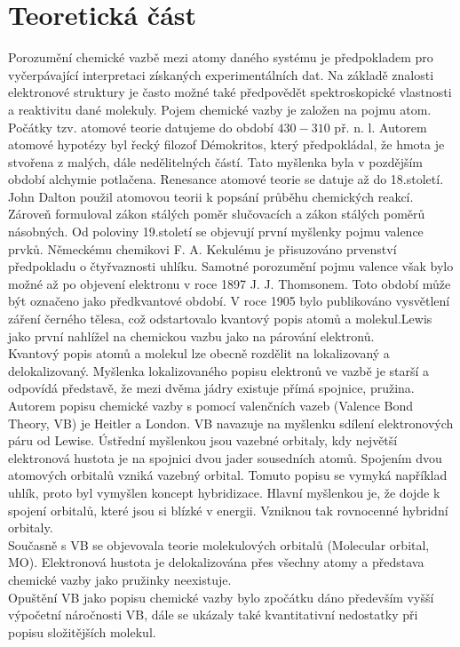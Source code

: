 \documentclass[
  digital, %
  table,   %
  lof,     %
  lot,     %
]{fithesis3}
\begin{document}
\chapter{Teoretická část}
Porozumění chemické vazbě mezi atomy daného systému je předpokladem pro vyčerpávající interpretaci získaných experimentálních dat. Na základě znalosti elektronové struktury je často možné také předpovědět spektroskopické vlastnosti a reaktivitu dané molekuly. Pojem chemické vazby je založen na pojmu atom. Počátky tzv. atomové teorie datujeme do období $430-310$ př. n. l. Autorem atomové hypotézy byl řecký filozof Démokritos, který předpokládal, že hmota je stvořena z malých, dále nedělitelných částí. Tato myšlenka byla v pozdějším období alchymie potlačena. Renesance atomové teorie se datuje až do 18.století. John Dalton použil atomovou teorii k popsání průběhu chemických reakcí. Zároveň formuloval zákon stálých poměr slučovacích a zákon stálých poměrů násobných. Od poloviny 19.století se objevují první myšlenky pojmu valence prvků. Německému chemikovi F. A. Kekulému je přisuzováno prvenství předpokladu o čtyřvaznosti uhlíku. Samotné porozumění pojmu valence však bylo možné až po objevení elektronu v roce 1897 J. J. Thomsonem. Toto období může být označeno jako předkvantové období. V roce 1905 bylo publikováno vysvětlení záření černého tělesa, což odstartovalo kvantový popis atomů a molekul.Lewis jako první nahlížel na chemickou vazbu jako na párování elektronů. \cite{Munzarova1996thesis} \\
Kvantový popis atomů a molekul lze obecně rozdělit na lokalizovaný a delokalizovaný. Myšlenka lokalizovaného popisu elektronů ve vazbě je starší a odpovídá představě, že mezi dvěma jádry existuje přímá spojnice, pružina. Autorem popisu chemické vazby s pomocí valenčních vazeb (Valence Bond Theory, VB) je Heitler a London. VB navazuje na myšlenku sdílení elektronových páru od Lewise. Ústřední myšlenkou jsou vazebné orbitaly, kdy největší elektronová hustota je na spojnici dvou jader sousedních atomů. Spojením dvou atomových orbitalů vzniká vazebný orbital. Tomuto popisu se vymyká například uhlík, proto byl vymyšlen koncept hybridizace. Hlavní myšlenkou je, že dojde k spojení orbitalů, které jsou si blízké v energii. Vzniknou tak rovnocenné hybridní orbitaly. \cite{Munzarova1996thesis} \\
Současně s VB se objevovala teorie molekulových orbitalů (Molecular orbital, MO). Elektronová hustota je delokalizována přes všechny atomy a představa chemické vazby jako pružinky neexistuje.\cite{Munzarova1996thesis} \\
Opuštění VB jako popisu chemické vazby bylo zpočátku dáno především vyšší výpočetní náročnosti VB, dále se ukázaly také kvantitativní nedostatky při popisu složitějších molekul. \cite{lowe2011quantum} 
\end{document}
